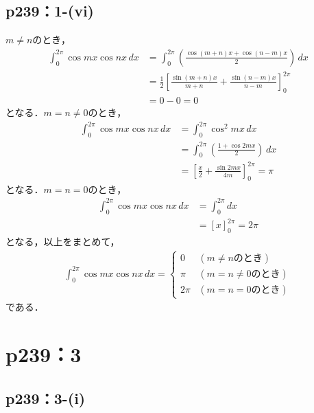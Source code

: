 \documentclass[a4paper,10pt,fleqn]{ltjsarticle}
\begin{document}
\subsection*{p239：1-(vi)}
	\begin{screen}
		$m \ne n$のとき，
		\begin{align*}
			\int_{0}^{2\pi} \cos mx \cos nx \, dx & = \int_{0}^{2\pi} \left (\frac{\cos(m+n)x+\cos(n-m)x}{2}\right) \, dx\\
			& = \frac{1}{2} \left [\frac{\sin (m+n)x}{m+n}+\frac{\sin(n-m)x}{n-m}\right]_{0}^{2\pi} \\
			& = 0-0 =0
		\end{align*}
		となる．$m =n \ne 0$のとき，
		\begin{align*}
			\int_{0}^{2\pi} \cos mx \cos nx \, dx & = \int_{0}^{2\pi} \cos^2 mx \, dx \\
			& = \int_{0}^{2\pi} \left (\frac{1+\cos 2mx}{2}\right) \, dx  \\
			& = \left [\frac{x}{2}+\frac{\sin 2mx}{4m}\right]_{0}^{2\pi} = \pi
		\end{align*}
		となる．$m =n =0$のとき，
		\begin{align*}
			\int_{0}^{2\pi} \cos mx \cos nx \, dx & = \int_{0}^{2\pi} dx \\
			& = [x]_{0}^{2\pi} = 2\pi
		\end{align*}
		となる，以上をまとめて，
		\begin{align*}
			\int_{0}^{2\pi} \cos mx \cos nx \, dx =
			\begin{cases}
				0 & (m \ne n のとき)\\
				\pi & (m = n\ne 0のとき)\\
				2 \pi & (m=n=0 のとき)
			\end{cases}
		\end{align*}
		である．
	\end{screen}

    \section*{p239：3}

    \subsection*{p239：3-(i)}
\end{document}
